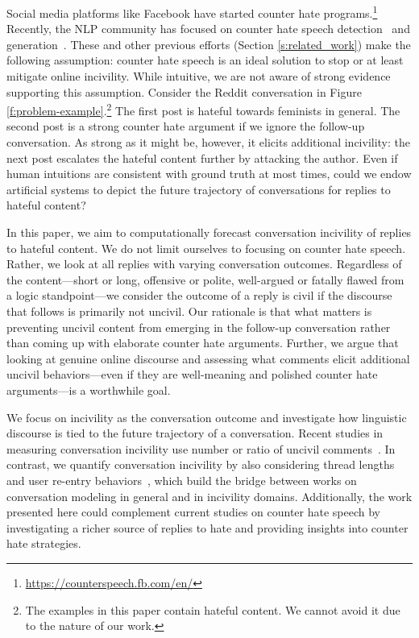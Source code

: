 \documentclass[11pt]{article}
\begin{document}
	Social media platforms like Facebook have started counter hate programs.\footnote{\url{https://counterspeech.fb.com/en/}} 
	Recently, the NLP community has focused on counter hate speech detection~\cite{DBLP:conf/icwsm/MathewSTRSMG019,yu-etal-2022-hate} and generation~\cite{tekiroglu-etal-2020-generating,fanton-etal-2021-human,zhu-bhat-2021-generate}.
	These and other previous efforts (Section \ref{s:related_work}) make the following assumption:
	counter hate speech is an ideal solution to stop or at least mitigate online incivility.
	While intuitive, we are not aware of strong evidence supporting this assumption.
	Consider the Reddit conversation in Figure \ref{f:problem-example}.\footnote{The examples in this paper contain hateful content. We cannot avoid it due to the nature of our work.}
	The first post is hateful towards feminists in general. 
	The second post is a strong counter hate argument if we ignore the follow-up conversation.
	As strong as it might be, however, it elicits additional incivility: the next post escalates the hateful content further by attacking the author.
	Even if human intuitions are consistent with ground truth at most times, could we endow artificial systems to depict the future trajectory of conversations for replies to hateful content?
	
	In this paper, we aim to computationally forecast conversation incivility of replies to hateful content.
	We do not limit ourselves to focusing on counter hate speech. 
	Rather, we look at all replies with varying conversation outcomes. 
	Regardless of the content---short or long, offensive or polite, well-argued or fatally flawed from a logic standpoint---we consider the outcome of a reply is civil if the discourse that follows is primarily not uncivil.
	Our rationale is that what matters is preventing uncivil content from emerging in the follow-up conversation rather than coming up with elaborate counter hate arguments.
	Further, we argue that looking at genuine online discourse and assessing what comments elicit additional uncivil behaviors---even if they are well-meaning and polished counter hate arguments---is a worthwhile goal.
	
	We focus on incivility as the conversation outcome and investigate how linguistic discourse is tied to the future trajectory of a conversation. 
	Recent studies in measuring conversation incivility use number or ratio of uncivil comments~\cite{DBLP:conf/icwsm/LiuGHC18,10.1145/3366423.3380273,DBLP:conf/kdd/DahiyaSSGCEMB021,garland2022impact}.
	In contrast, we quantify conversation incivility by also considering thread lengths~\cite{tsagkias2009predicting,Yano_Smith_2010,artzi-etal-2012-predicting} and user re-entry behaviors~\cite{10.1145/2433396.2433401}, which build the bridge between works on conversation modeling in general and in incivility domains.
	Additionally, the work presented here could complement current studies on counter hate speech by 
	investigating a richer source of replies to hate 
	and 
	providing insights into counter hate strategies.
	
\end{document}
